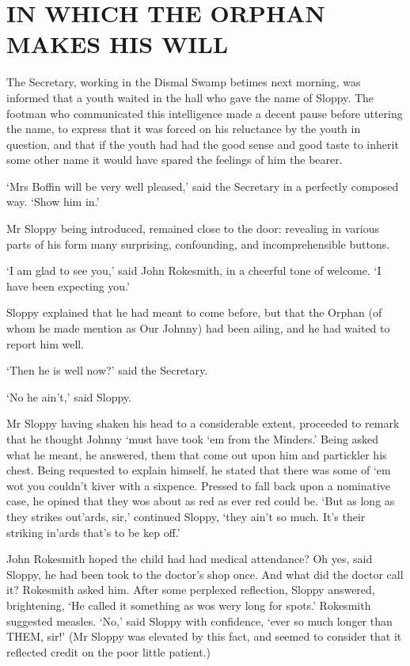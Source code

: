 
\chapter{IN WHICH THE ORPHAN MAKES HIS WILL}

The Secretary, working in the Dismal Swamp betimes next morning, was
informed that a youth waited in the hall who gave the name of Sloppy.
The footman who communicated this intelligence made a decent pause
before uttering the name, to express that it was forced on his
reluctance by the youth in question, and that if the youth had had
the good sense and good taste to inherit some other name it would have
spared the feelings of him the bearer.

‘Mrs Boffin will be very well pleased,’ said the Secretary in a
perfectly composed way. ‘Show him in.’

Mr Sloppy being introduced, remained close to the door: revealing
in various parts of his form many surprising, confounding, and
incomprehensible buttons.

‘I am glad to see you,’ said John Rokesmith, in a cheerful tone of
welcome. ‘I have been expecting you.’

Sloppy explained that he had meant to come before, but that the Orphan
(of whom he made mention as Our Johnny) had been ailing, and he had
waited to report him well.

‘Then he is well now?’ said the Secretary.

‘No he ain’t,’ said Sloppy.

Mr Sloppy having shaken his head to a considerable extent, proceeded
to remark that he thought Johnny ‘must have took ‘em from the Minders.’
Being asked what he meant, he answered, them that come out upon him and
partickler his chest. Being requested to explain himself, he stated that
there was some of ‘em wot you couldn’t kiver with a sixpence. Pressed to
fall back upon a nominative case, he opined that they wos about as
red as ever red could be. ‘But as long as they strikes out’ards, sir,’
continued Sloppy, ‘they ain’t so much. It’s their striking in’ards
that’s to be kep off.’

John Rokesmith hoped the child had had medical attendance? Oh yes, said
Sloppy, he had been took to the doctor’s shop once. And what did the
doctor call it? Rokesmith asked him. After some perplexed reflection,
Sloppy answered, brightening, ‘He called it something as wos wery
long for spots.’ Rokesmith suggested measles. ‘No,’ said Sloppy with
confidence, ‘ever so much longer than THEM, sir!’ (Mr Sloppy was
elevated by this fact, and seemed to consider that it reflected credit
on the poor little patient.)


